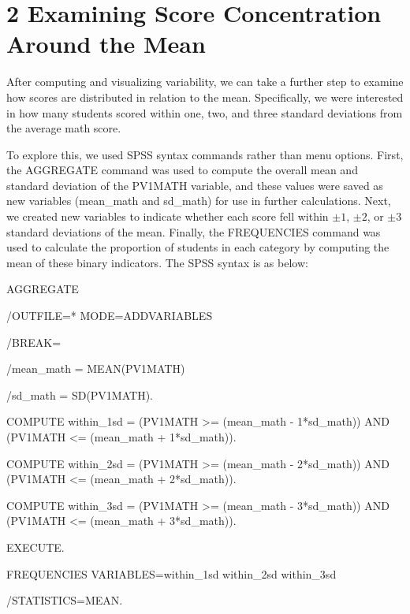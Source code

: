 \documentclass[
  letterpaper,
  DIV=11,
  numbers=noendperiod]{scrreprt}
\newenvironment{Shaded}{\begin{snugshade}}{\end{snugshade}}
\newcommand{\NormalTok}[1]{\textcolor[rgb]{0.00,0.23,0.31}{#1}}
\begin{document}
\section*{2 Examining Score Concentration Around the
Mean}\label{examining-score-concentration-around-the-mean}


After computing and visualizing variability, we can take a further step
to examine how scores are distributed in relation to the mean.
Specifically, we were interested in how many students scored within one,
two, and three standard deviations from the average math score.

To explore this, we used SPSS syntax commands rather than menu options.
First, the AGGREGATE command was used to compute the overall mean and
standard deviation of the PV1MATH variable, and these values were saved
as new variables (mean\_math and sd\_math) for use in further
calculations. Next, we created new variables to indicate whether each
score fell within \(\pm1\), \(\pm2\), or \(\pm3\) standard deviations of
the mean. Finally, the FREQUENCIES command was used to calculate the
proportion of students in each category by computing the mean of these
binary indicators. The SPSS syntax is as below:

\begin{Shaded}
\begin{Highlighting}[]
\NormalTok{AGGREGATE }

\NormalTok{  /OUTFILE=* MODE=ADDVARIABLES }

\NormalTok{  /BREAK= }

\NormalTok{  /mean\_math = MEAN(PV1MATH) }

\NormalTok{  /sd\_math = SD(PV1MATH). }

 

\NormalTok{COMPUTE within\_1sd = (PV1MATH \textgreater{}= (mean\_math {-} 1*sd\_math)) AND (PV1MATH \textless{}= (mean\_math + 1*sd\_math)). }

\NormalTok{COMPUTE within\_2sd = (PV1MATH \textgreater{}= (mean\_math {-} 2*sd\_math)) AND (PV1MATH \textless{}= (mean\_math + 2*sd\_math)). }

\NormalTok{COMPUTE within\_3sd = (PV1MATH \textgreater{}= (mean\_math {-} 3*sd\_math)) AND (PV1MATH \textless{}= (mean\_math + 3*sd\_math)). }

\NormalTok{EXECUTE. }

 

\NormalTok{FREQUENCIES VARIABLES=within\_1sd within\_2sd within\_3sd }

\NormalTok{  /STATISTICS=MEAN. }
\end{Highlighting}
\end{Shaded}
\end{document}
